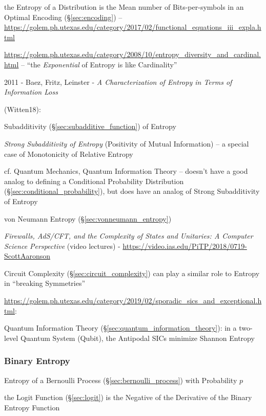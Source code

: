the Entropy of a Distribution is the Mean number of Bits-per-symbols in an
Optimal Encoding (\S\ref{sec:encoding}) --
\url{https://golem.ph.utexas.edu/category/2017/02/functional_equations_iii_expla.html}

\url{https://golem.ph.utexas.edu/category/2008/10/entropy_diversity_and_cardinal.html}
-- ``the \emph{Exponential} of Entropy is like Cardinality''

2011 - Baez, Fritz, Leinster - \emph{A Characterization of Entropy in Terms of
  Information Loss}

\asterism

(Witten18):

Subadditivity (\S\ref{sec:subadditive_function}) of Entropy

\emph{Strong Subadditivity of Entropy} (Positivity of Mutual Information) --
a special case of Monotonicity of Relative Entropy

cf. Quantum Mechanics, Quantum Information Theory
-- doesn't have a good analog to defining a Conditional Probability Distribution
(\S\ref{sec:conditional_probability}), but does have an analog of Strong
Subadditivity of Entropy

\fist von Neumann Entropy (\S\ref{sec:vonneumann_entropy})

\asterism

\emph{Firewalls, AdS/CFT, and the Complexity of States and Unitaries: A Computer
  Science Perspective}
(video lectures)
-
\url{https://video.ias.edu/PiTP/2018/0719-ScottAaronson}

Circuit Complexity (\S\ref{sec:circuit_complexity}) can play a similar role to
Entropy in ``breaking Symmetries''

\asterism

\url{https://golem.ph.utexas.edu/category/2019/02/sporadic_sics_and_exceptional.html}:

Quantum Information Theory (\S\ref{sec:quantum_information_theory}): in a
two-level Quantum System (Qubit), the Antipodal SICs minimize Shannon Entropy



\subsubsection{Binary Entropy}\label{sec:binary_entropy}

Entropy of a Bernoulli Process (\S\ref{sec:bernoulli_process}) with Probability
$p$

the Logit Function (\S\ref{sec:logit}) is the Negative of the Derivative of the
Binary Entropy Function




